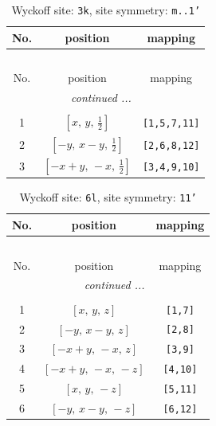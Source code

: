 \documentclass[fleqn,8pt]{jsarticle}
\begin{document}
\begin{longtable}{ccc}
\caption{Wyckoff site: {\tt 3k}, site symmetry: {\tt m..1'}}
 \\
 \hline \hline
No. & position & mapping \\ \hline \endfirsthead

\multicolumn{2}{l}{\tablename\ \thetable{}} \\
 \hline \hline
No. & position & mapping \\ \hline \endhead

 \hline \hline
\multicolumn{2}{r}{\footnotesize\it continued ...} \\ \endfoot

 \hline \hline
\multicolumn{2}{r}{} \\ \endlastfoot

1 & $\left[ x,\, y,\, \frac{1}{2} \right]$ & {\tt [1,5,7,11]} \\ \hline
2 & $\left[ - y,\, x - y,\, \frac{1}{2} \right]$ & {\tt [2,6,8,12]} \\ \hline
3 & $\left[ - x + y,\, - x,\, \frac{1}{2} \right]$ & {\tt [3,4,9,10]} \\
\end{longtable}
\renewcommand{\arraystretch}{1.2}
\begin{longtable}{ccc}
\caption{Wyckoff site: {\tt 6l}, site symmetry: {\tt 11'}}
 \\
 \hline \hline
No. & position & mapping \\ \hline \endfirsthead

\multicolumn{2}{l}{\tablename\ \thetable{}} \\
 \hline \hline
No. & position & mapping \\ \hline \endhead

 \hline \hline
\multicolumn{2}{r}{\footnotesize\it continued ...} \\ \endfoot

 \hline \hline
\multicolumn{2}{r}{} \\ \endlastfoot

1 & $\left[ x,\, y,\, z \right]$ & {\tt [1,7]} \\ \hline
2 & $\left[ - y,\, x - y,\, z \right]$ & {\tt [2,8]} \\ \hline
3 & $\left[ - x + y,\, - x,\, z \right]$ & {\tt [3,9]} \\ \hline
4 & $\left[ - x + y,\, - x,\, - z \right]$ & {\tt [4,10]} \\ \hline
5 & $\left[ x,\, y,\, - z \right]$ & {\tt [5,11]} \\ \hline
6 & $\left[ - y,\, x - y,\, - z \right]$ & {\tt [6,12]} \\
\end{longtable}
\end{document}
